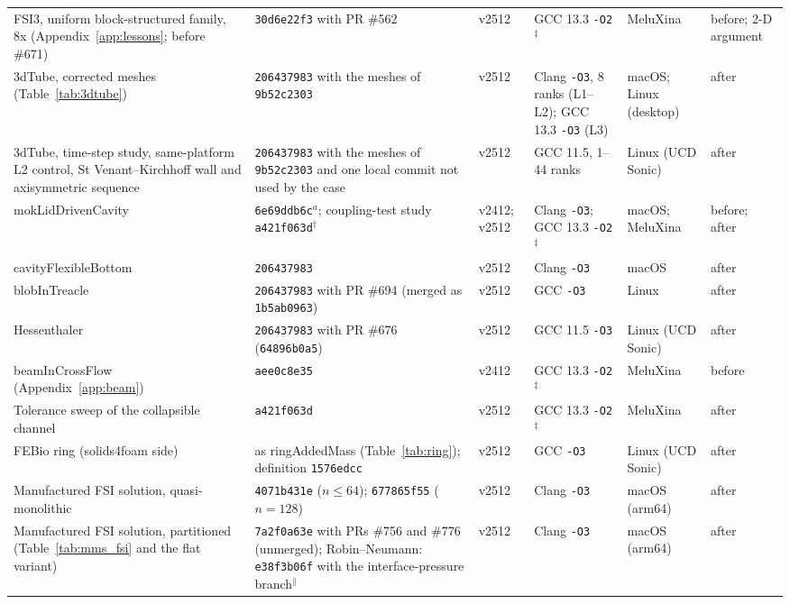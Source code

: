 \begin{table}[htbp]
\begin{tabular}{p{2.9cm}p{2.5cm}p{1.5cm}p{2.4cm}p{1.8cm}p{2.1cm}}
		FSI3, uniform block-structured family, 8x (Appendix~\ref{app:lessons}; before \#671) & \texttt{30d6e22f3} with PR \#562 & v2512 & GCC 13.3 \texttt{-O2}$^\ddagger$ & MeluXina & before; 2-D argument \\
		3dTube, corrected meshes (Table~\ref{tab:3dtube}) & \texttt{206437983} with the meshes of \texttt{9b52c2303} & v2512 & Clang \texttt{-O3}, 8 ranks (L1--L2); GCC 13.3 \texttt{-O3} (L3) & macOS; Linux (desktop) & after \\
		3dTube, time-step study, same-platform L2 control, St Venant--Kirchhoff wall and axisymmetric sequence & \texttt{206437983} with the meshes of \texttt{9b52c2303} and one local commit not used by the case & v2512 & GCC 11.5, 1--44 ranks & Linux (UCD Sonic) & after \\
		mokLidDrivenCavity & \texttt{6e69ddb6c}$^a$; coupling-test study \texttt{a421f063d}$^\dagger$ & v2412; v2512 & Clang \texttt{-O3}; GCC 13.3 \texttt{-O2}$^\ddagger$ & macOS; MeluXina & before; after \\
		cavityFlexibleBottom & \texttt{206437983} & v2512 & Clang \texttt{-O3} & macOS & after \\
		blobInTreacle & \texttt{206437983} with PR \#694 (merged as \texttt{1b5ab0963}) & v2512 & GCC \texttt{-O3} & Linux & after \\
		Hessenthaler & \texttt{206437983} with PR \#676 (\texttt{64896b0a5}) & v2512 & GCC 11.5 \texttt{-O3} & Linux (UCD Sonic) & after \\
		beamInCrossFlow (Appendix~\ref{app:beam}) & \texttt{aee0c8e35} & v2412 & GCC 13.3 \texttt{-O2}$^\ddagger$ & MeluXina & before \\
		Tolerance sweep of the collapsible channel & \texttt{a421f063d} & v2512 & GCC 13.3 \texttt{-O2}$^\ddagger$ & MeluXina & after \\
		FEBio ring (solids4foam side) & as ringAddedMass (Table~\ref{tab:ring}); definition \texttt{1576edcc} & v2512 & GCC \texttt{-O3} & Linux (UCD Sonic) & after \\
		Manufactured FSI solution, quasi-monolithic & \texttt{4071b431e} ($n \leq 64$); \texttt{677865f55} ($n = 128$) & v2512 & Clang \texttt{-O3} & macOS (arm64) & after \\
		Manufactured FSI solution, partitioned (Table~\ref{tab:mms_fsi} and the flat variant) & \texttt{7a2f0a63e} with PRs \#756 and \#776 (unmerged); Robin--Neumann: \texttt{e38f3b06f} with the interface-pressure branch$^\|$ & v2512 & Clang \texttt{-O3} & macOS (arm64) & after \\

\end{tabular}
\end{table}

